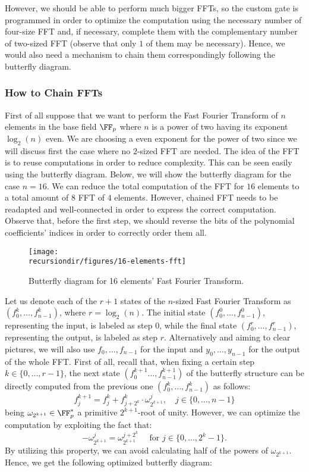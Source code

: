 However, we should be able to perform much bigger FFTs, so the custom gate is programmed in order to optimize the computation using the necessary number of four-size FFT and, if necessary, complete them with the complementary number of two-sized FFT (observe that only $1$ of them may be necessary). Hence, we would also need a mechanism to chain them correspondingly following the butterfly diagram. 




\subsubsection{How to Chain FFTs}

First of all suppose that we want to perform the Fast Fourier Transform of $n$ elements in the base field $\FF_p$ where $n$ is a power of two having its exponent $\log_2(n)$ even. We are choosing a even exponent for the power of two since we will discuss first the case where no $2$-sized FFT are needed. The idea of the FFT is to reuse computations in order to reduce complexity. This can be seen easily using the butterfly diagram. Below, we will show the butterfly diagram for the case $n = 16$. We can reduce the total computation of the FFT for $16$ elements to a total amount of $8$ FFT of $4$ elements. However, chained FFT needs to be readapted and well-connected in order to express the correct computation. Observe that, before the first step, we should reverse the bits of the polynomial coefficients' indices in order to correctly order them all.


\begin{figure}[H]
\centering
\texttt{[image: \\recursiondir/figures/16-elements-fft]}
\caption{Butterfly diagram for 16 elements' Fast Fourier Transform.}
\label{fig:c12a-proof}
\end{figure}

Let us denote each of the $r + 1$ states of the $n$-sized Fast Fourier Transform as $(f_0^k, \dots, f_{n-1}^k)$, where $r = \log_2(n)$. The initial state $(f_0^0, \dots, f_{n-1}^0)$, representing the input, is labeled as step $0$, while the final state $(f_0^r, \dots, f_{n-1}^r)$, representing the output, is labeled as step $r$. Alternatively and aiming to clear pictures, we will also use $f_0, \dots, f_{n-1}$ for the input and $y_0, \dots, y_{n-1}$ for the output of the whole FFT. First of all, recall that, when fixing a certain step $k \in \{0, \dots, r - 1\}$, the next state $(f_0^{k+1} \dots, f_{n-1}^{k+1})$ of the butterfly structure can be directly computed from the previous one $(f_0^{k}, \dots, f_{n-1}^{k})$ as follows:
\[
f_j^{k+1} = f_j^{k} + f_{j + 2^k}^{k} \cdot \omega_{2^{k+1}}^j, \quad j \in \{0, \dots, n-1\}
\]
being $\omega_{2^{k+1}} \in \FF_p^*$ a primitive $2^{k+1}$-root of unity. However, we can optimize the computation by exploiting the fact that:
\[
- \omega_{2^{k+1}}^j = \omega_{2^{k+1}}^{j + 2^k} \quad \text{ for } j \in \{0, \dots, 2^k - 1\}.
\]
By utilizing this property, we can avoid calculating half of the powers of $\omega_{2^{k+1}}$. Hence, we get the following optimized butterfly diagram:

